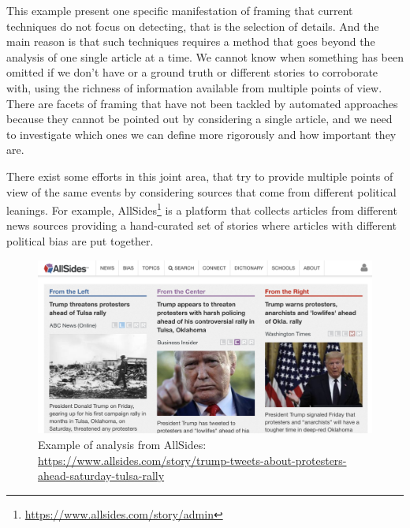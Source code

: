 This example present one specific manifestation of framing that current techniques do not focus on detecting, that is the selection of details.
And the main reason is that such techniques requires a method that goes beyond the analysis of one single article at a time.
We cannot know when something has been omitted if we don't have or a ground truth or different stories to corroborate with, using the richness of information available from multiple points of view.
There are facets of framing that have not been tackled by automated approaches because they cannot be pointed out by considering a single article, and we need to investigate which ones we can define more rigorously and how important they are.

There exist some efforts in this joint area, that try to provide multiple points of view of the same events by considering sources that come from different political leanings.
For example, AllSides\footnote{\url{https://www.allsides.com/story/admin}} is a platform that collects articles from different news sources providing a hand-curated set of stories where articles with different political bias are put together.

\begin{figure}[!htb]
    \centering
    \includegraphics[width=\linewidth]{figures/allsides.png}
    \caption{Example of analysis from AllSides: \url{https://www.allsides.com/story/trump-tweets-about-protesters-ahead-saturday-tulsa-rally}}
    \label{fig:allsides}
\end{figure}

